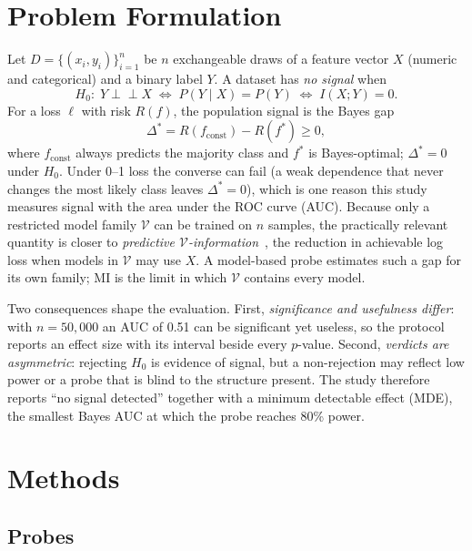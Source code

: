 \section{Problem Formulation}
\label{sec:problem}

Let $D=\{(x_i,y_i)\}_{i=1}^n$ be $n$ exchangeable draws of a feature vector $X$ (numeric and categorical) and a binary label $Y$. A dataset has \emph{no signal} when
\begin{equation}
H_0:\; Y\perp\!\!\!\perp X \;\Longleftrightarrow\; P(Y\mid X)=P(Y) \;\Longleftrightarrow\; I(X;Y)=0 .
\label{eq:h0}
\end{equation}
For a loss $\ell$ with risk $R(f)$, the population signal is the Bayes gap
\begin{equation}
\Delta^{*}=R(f_{\mathrm{const}})-R(f^{*})\ge 0,
\label{eq:bayesgap}
\end{equation}
where $f_{\mathrm{const}}$ always predicts the majority class and $f^{*}$ is Bayes-optimal; $\Delta^{*}=0$ under $H_0$. Under 0--1 loss the converse can fail (a weak dependence that never changes the most likely class leaves $\Delta^*=0$), which is one reason this study measures signal with the area under the ROC curve (AUC). Because only a restricted model family $\mathcal{V}$ can be trained on $n$ samples, the practically relevant quantity is closer to \emph{predictive $\mathcal{V}$-information}~\cite{xu2020,ethayarajh2022}, the reduction in achievable log loss when models in $\mathcal{V}$ may use $X$. A model-based probe estimates such a gap for its own family; MI is the limit in which $\mathcal{V}$ contains every model.

Two consequences shape the evaluation. First, \emph{significance and usefulness differ}: with $n=50{,}000$ an AUC of 0.51 can be significant yet useless, so the protocol reports an effect size with its interval beside every $p$-value. Second, \emph{verdicts are asymmetric}: rejecting $H_0$ is evidence of signal, but a non-rejection may reflect low power or a probe that is blind to the structure present. The study therefore reports ``no signal detected'' together with a minimum detectable effect (MDE), the smallest Bayes AUC at which the probe reaches 80\% power.

\section{Methods}
\label{sec:methods}

\subsection{Probes}

